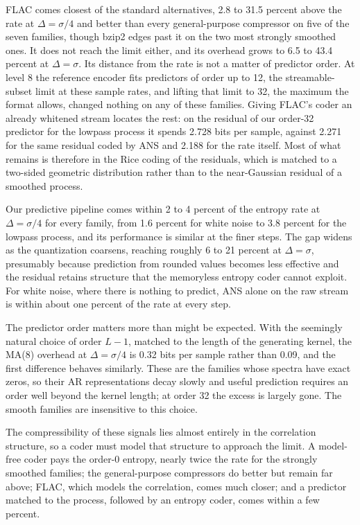\documentclass[11pt]{article}
\begin{document}
FLAC comes closest of the standard alternatives, 2.8 to 31.5 percent above the rate at \(\Delta = \sigma/4\) and better than every general-purpose compressor on five of the seven families, though bzip2 edges past it on the two most strongly smoothed ones. It does not reach the limit either, and its overhead grows to 6.5 to 43.4 percent at \(\Delta = \sigma\). Its distance from the rate is not a matter of predictor order. At level 8 the reference encoder fits predictors of order up to 12, the streamable-subset limit at these sample rates, and lifting that limit to 32, the maximum the format allows, changed nothing on any of these families. Giving FLAC's coder an already whitened stream locates the rest: on the residual of our order-32 predictor for the lowpass process it spends 2.728 bits per sample, against 2.271 for the same residual coded by ANS and 2.188 for the rate itself. Most of what remains is therefore in the Rice coding of the residuals, which is matched to a two-sided geometric distribution rather than to the near-Gaussian residual of a smoothed process.

Our predictive pipeline comes within 2 to 4 percent of the entropy rate at \(\Delta = \sigma/4\) for every family, from 1.6 percent for white noise to 3.8 percent for the lowpass process, and its performance is similar at the finer steps. The gap widens as the quantization coarsens, reaching roughly 6 to 21 percent at \(\Delta = \sigma\), presumably because prediction from rounded values becomes less effective and the residual retains structure that the memoryless entropy coder cannot exploit. For white noise, where there is nothing to predict, ANS alone on the raw stream is within about one percent of the rate at every step.

The predictor order matters more than might be expected. With the seemingly natural choice of order \(L - 1\), matched to the length of the generating kernel, the MA(8) overhead at \(\Delta = \sigma/4\) is 0.32 bits per sample rather than 0.09, and the first difference behaves similarly. These are the families whose spectra have exact zeros, so their AR representations decay slowly and useful prediction requires an order well beyond the kernel length; at order 32 the excess is largely gone. The smooth families are insensitive to this choice.

The compressibility of these signals lies almost entirely in the correlation structure, so a coder must model that structure to approach the limit. A model-free coder pays the order-0 entropy, nearly twice the rate for the strongly smoothed families; the general-purpose compressors do better but remain far above; FLAC, which models the correlation, comes much closer; and a predictor matched to the process, followed by an entropy coder, comes within a few percent.
\end{document}
